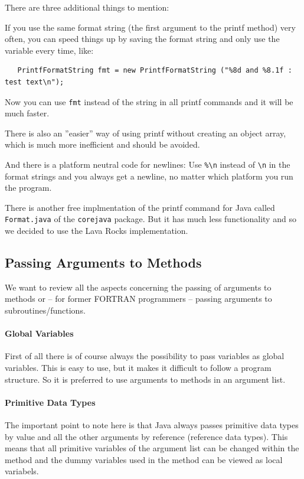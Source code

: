 There are three additional things to mention: 

If you use the
same format string (the first argument to the printf method) 
very often, you can speed things up by saving the format string
and only use the variable every time, like:
\begin{verbatim}
   PrintfFormatString fmt = new PrintfFormatString ("%8d and %8.1f : test text\n");
\end{verbatim}
Now you can use \verb|fmt| instead of the string in all printf commands
and it will be much faster.

There is also an ''easier'' way of using printf without creating
an object array, which is much more inefficient and should be avoided.

And there is a platform neutral code for newlines: Use \verb|%\n| instead
of \verb|\n| in the format strings and you always get a newline,
no matter which platform you run the program.

There is another free implmentation of the printf command for
Java called \verb|Format.java| of the \verb|corejava| package.
But it has much less functionality and so we decided to use
the Lava Rocks implementation.

\subsection{Passing Arguments to Methods}
We want to review all the aspects concerning the passing of
arguments to methods or -- for former FORTRAN programmers --
passing arguments to subroutines/functions.

\paragraph{Global Variables}
First of all there is of course always the possibility to 
pass variables as global variables. This is easy to use,
but it makes it difficult to follow a program structure.
So it is preferred to use arguments to methods in an
argument list.

\paragraph{Primitive Data Types}
The important point to note here is that Java always
passes primitive data types by value and all the other
arguments by reference (reference data types). 
This means that all primitive
variables of the argument list can be changed within
the method and the dummy variables used in the method 
can be viewed as local variabels.

